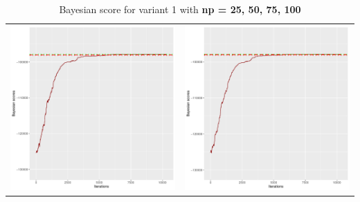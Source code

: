 \documentclass[]{scrartcl}
\begin{document}
\begin{table}[h!]
\begin{tabular}{cc}
\includegraphics[scale = 0.4]{./figs/hepar2/v1/75/bayBoundsEvolution-10352.pdf} & 
\includegraphics[scale = 0.4]{./figs/hepar2/v1/100/bayBoundsEvolution-10352.pdf} \\
\end{tabular}
\caption{Bayesian score for variant 1 with \textbf{np =  25, 50, 75, 100}}
\end{table}
\end{document}
